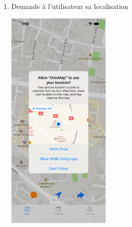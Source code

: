 \documentclass{article}
\begin{document}
\begin{enumerate}
\item Demande à l'utilisateur sa localisation
    \begin{center}
        \includegraphics[width=50mm, scale=0.5]{allowUserLocation.png}
    \end{center}



\end{enumerate}
\end{document}
